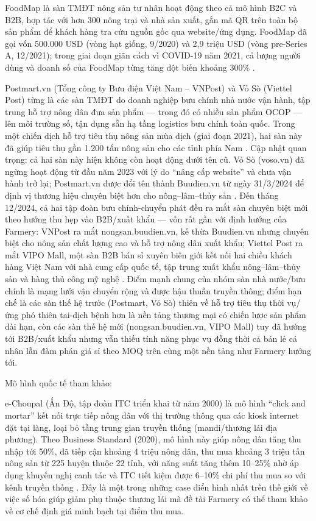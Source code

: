 FoodMap là sàn TMĐT nông sản tư nhân hoạt động theo cả mô hình B2C và B2B, hợp tác với hơn 300 nông trại và nhà sản xuất, gắn mã QR trên toàn bộ sản phẩm để khách hàng tra cứu nguồn gốc qua website/ứng dụng. FoodMap đã gọi vốn 500.000 USD (vòng hạt giống, 9/2020) và 2,9 triệu USD (vòng pre-Series A, 12/2021); trong giai đoạn giãn cách vì COVID-19 năm 2021, cả lượng người dùng và doanh số của FoodMap từng tăng đột biến khoảng 300\% \cite{foodmap}.

Postmart.vn (Tổng công ty Bưu điện Việt Nam -- VNPost) và Vỏ Sò (Viettel Post) từng là các sàn TMĐT do doanh nghiệp bưu chính nhà nước vận hành, tập trung hỗ trợ nông dân đưa sản phẩm --- trong đó có nhiều sản phẩm OCOP --- lên môi trường số, tận dụng sẵn hạ tầng logistics bưu chính toàn quốc. Trong một chiến dịch hỗ trợ tiêu thụ nông sản mùa dịch (giai đoạn 2021), hai sàn này đã giúp tiêu thụ gần 1.200 tấn nông sản cho các tỉnh phía Nam \cite{postmart_voso_2021}. Cập nhật quan trọng: cả hai sàn này hiện không còn hoạt động dưới tên cũ. Vỏ Sò (voso.vn) đã ngừng hoạt động từ đầu năm 2023 với lý do ``nâng cấp website'' và chưa vận hành trở lại; Postmart.vn được đổi tên thành Buudien.vn từ ngày 31/3/2024 để định vị thương hiệu chuyên biệt hơn cho nông--lâm--thủy sản \cite{buudien_2024}. Đến tháng 12/2024, cả hai tập đoàn bưu chính-chuyển phát đều ra mắt sàn chuyên biệt mới theo hướng thu hẹp vào B2B/xuất khẩu --- vốn rất gần với định hướng của Farmery: VNPost ra mắt nongsan.buudien.vn, kế thừa Buudien.vn nhưng chuyên biệt cho nông sản chất lượng cao và hỗ trợ nông dân xuất khẩu; Viettel Post ra mắt VIPO Mall, một sàn B2B bán sỉ xuyên biên giới kết nối hai chiều khách hàng Việt Nam với nhà cung cấp quốc tế, tập trung xuất khẩu nông--lâm--thủy sản và hàng thủ công mỹ nghệ \cite{vipo_nongsan_2024}. Điểm mạnh chung của nhóm sàn nhà nước/bưu chính là mạng lưới vận chuyển rộng và được hậu thuẫn truyền thông; điểm hạn chế là các sàn thế hệ trước (Postmart, Vỏ Sò) thiên về hỗ trợ tiêu thụ thời vụ/ứng phó thiên tai-dịch bệnh hơn là nền tảng thương mại có chiến lược sản phẩm dài hạn, còn các sàn thế hệ mới (nongsan.buudien.vn, VIPO Mall) tuy đã hướng tới B2B/xuất khẩu nhưng vẫn thiếu tính năng phục vụ đồng thời cả bán lẻ cá nhân lẫn đàm phán giá sỉ theo MOQ trên cùng một nền tảng như Farmery hướng tới.

Mô hình quốc tế tham khảo:

e-Choupal (Ấn Độ, tập đoàn ITC triển khai từ năm 2000) là mô hình ``click and mortar'' kết nối trực tiếp nông dân với thị trường thông qua các kiosk internet đặt tại làng, loại bỏ tầng trung gian truyền thống (mandi/thương lái địa phương). Theo Business Standard (2020), mô hình này giúp nông dân tăng thu nhập tới 50\%, đã tiếp cận khoảng 4 triệu nông dân, thu mua khoảng 3 triệu tấn nông sản từ 225 huyện thuộc 22 tỉnh, với năng suất tăng thêm 10--25\% nhờ áp dụng khuyến nghị canh tác và ITC tiết kiệm được 6--10\% chi phí thu mua so với kênh truyền thống \cite{business_standard_2020_echoupal}. Đây là một trong những case điển hình nhất trên thế giới về việc số hóa giúp giảm phụ thuộc thương lái mà đề tài Farmery có thể tham khảo về cơ chế định giá minh bạch tại điểm thu mua.

